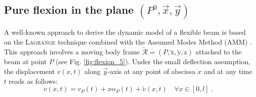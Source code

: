 \subsection{Pure flexion in the plane $(P^0,\vec{x},\vec{y})$}
A well-known approach to derive the dynamic model of a flexible beam is based on the \textsc{Lagrange} technique combined with the Assumed Modes Method (AMM) \cite{DeLucaSiciliano}. This approach involves a moving body frame $\widetilde{\mathcal{R}}=(P,\widetilde{\mathrm{x}},\widetilde{\mathrm{y}},\mathrm{z})$ attached to the beam at point $P$ (see Fig. \ref{fig:flexion_5}). Under the small deflection assumption, the displacement $v(x,t)$ along $\vec{y}$-axis at any point of abscissa $x$ and at any time $t$ reads as follows:
\begin{equation}\label{eq:defv}
v(x,t)=v_P(t)+x\alpha_P(t)+\widetilde{v}(x,t)\quad \forall x\in [0,l]\;.
\end{equation}

